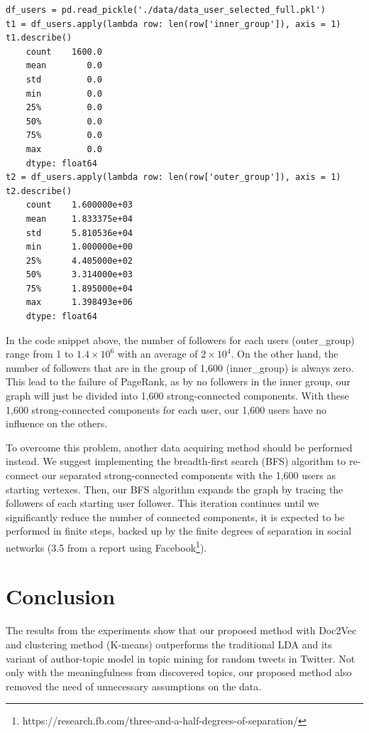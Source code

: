 \documentclass[11pt]{article}
\begin{document}
\begin{listing}[H]
    \begin{verbatim}
df_users = pd.read_pickle('./data/data_user_selected_full.pkl')
t1 = df_users.apply(lambda row: len(row['inner_group']), axis = 1)
t1.describe()
    count    1600.0
    mean        0.0
    std         0.0
    min         0.0
    25%         0.0
    50%         0.0
    75%         0.0
    max         0.0
    dtype: float64
t2 = df_users.apply(lambda row: len(row['outer_group']), axis = 1)
t2.describe()
    count    1.600000e+03
    mean     1.833375e+04
    std      5.810536e+04
    min      1.000000e+00
    25%      4.405000e+02
    50%      3.314000e+03
    75%      1.895000e+04
    max      1.398493e+06
    dtype: float64
    \end{verbatim}
\end{listing}

In the code snippet above, the number of followers for each users (outer\_group) range from 1 to $1.4\times 10^6$ with an average of $2\times 10^4$. On the other hand, the number of followers that are in the group of 1,600 (inner\_group) is always zero. This lead to the failure of PageRank, as by no followers in the inner group, our graph will just be divided into 1,600 strong-connected components. With these 1,600 strong-connected components for each user, our 1,600 users have no influence on the others.

To overcome this problem, another data acquiring method should be performed instead. We suggest implementing the breadth-first search (BFS) algorithm to re-connect our separated strong-connected components with the 1,600 users as starting vertexes. Then, our BFS algorithm expands the graph by tracing the followers of each starting user follower. This iteration continues until we significantly reduce the number of connected components, it is expected to be performed in finite steps, backed up by the finite degrees of separation in social networks (3.5 from a report using Facebook\footnote{https://research.fb.com/three-and-a-half-degrees-of-separation/}).

\section{Conclusion}
The results from the experiments show that our proposed method with Doc2Vec and clustering method (K-means) outperforms the traditional LDA and its variant of author-topic model in topic mining for random tweets in Twitter. Not only with the meaningfulness from discovered topics, our proposed method also removed the need of unnecessary assumptions on the data.
\end{document}

